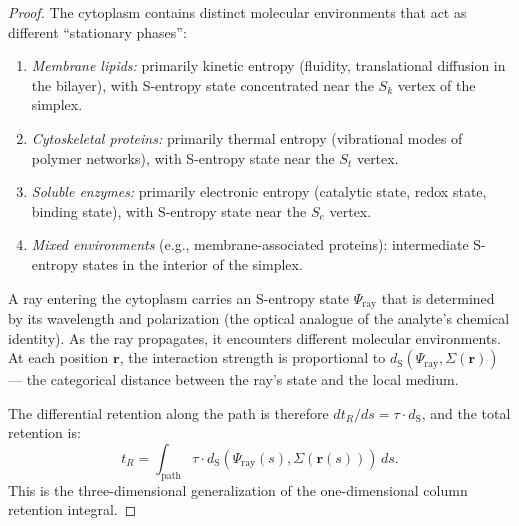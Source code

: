 \documentclass[11pt,twocolumn,a4paper]{article}
\newcommand{\Sk}{S_k}
\newcommand{\St}{S_t}
\newcommand{\Se}{S_e}
\newcommand{\dS}{d_{\mathrm{S}}}
\begin{document}
\begin{proof}
The cytoplasm contains distinct molecular environments that act as
different ``stationary phases'':

\begin{enumerate}[label=(\roman*),leftmargin=*]
\item \textit{Membrane lipids:} primarily kinetic entropy (fluidity,
  translational diffusion in the bilayer), with S-entropy state
  concentrated near the $\Sk$ vertex of the simplex.

\item \textit{Cytoskeletal proteins:} primarily thermal entropy
  (vibrational modes of polymer networks), with S-entropy state near
  the $\St$ vertex.

\item \textit{Soluble enzymes:} primarily electronic entropy
  (catalytic state, redox state, binding state), with S-entropy state
  near the $\Se$ vertex.

\item \textit{Mixed environments} (e.g., membrane-associated
  proteins): intermediate S-entropy states in the interior of the
  simplex.
\end{enumerate}

A ray entering the cytoplasm carries an S-entropy state
$\Psi_{\mathrm{ray}}$ that is determined by its wavelength and
polarization (the optical analogue of the analyte's chemical identity).
As the ray propagates, it encounters different molecular environments.
At each position $\mathbf{r}$, the interaction strength is
proportional to $\dS(\Psi_{\mathrm{ray}}, \Sigma(\mathbf{r}))$ --- the
categorical distance between the ray's state and the local medium.

The differential retention along the path is therefore
$dt_R/ds = \tau \cdot \dS$, and the total retention is:
\begin{equation}
t_R = \int_{\mathrm{path}} \tau \cdot \dS(\Psi_{\mathrm{ray}}(s),
  \Sigma(\mathbf{r}(s)))\,ds.
\label{eq:total-retention}
\end{equation}
This is the three-dimensional generalization of the one-dimensional
column retention integral.
\end{proof}

\end{document}
